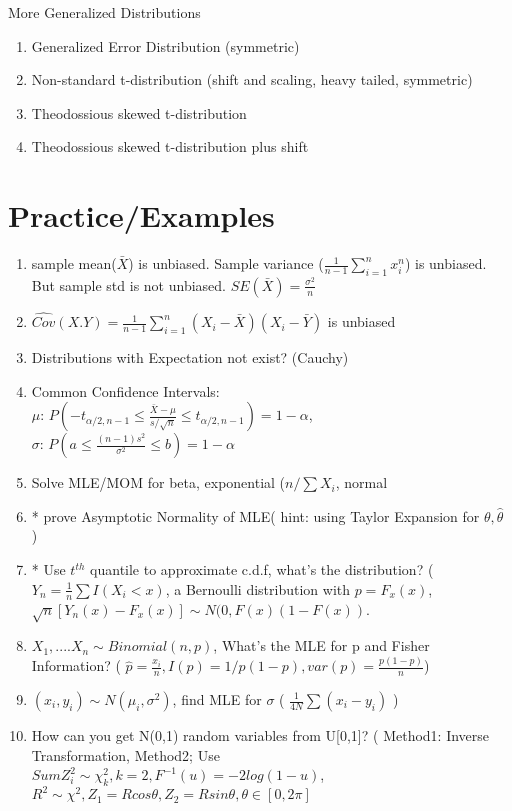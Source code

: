 \documentclass[11pt, openany]{book}              %
\begin{document}
More Generalized Distributions

\begin{enumerate}
	\item Generalized Error Distribution (symmetric)
	\item Non-standard t-distribution (shift and scaling, heavy tailed, symmetric)
	\item Theodossious skewed t-distribution
	\item Theodossious skewed t-distribution plus shift
\end{enumerate}



   
\section{Practice/Examples}

\begin{enumerate}

    \item sample mean($\bar{X}$) is unbiased. Sample variance ($\frac{1}{n-1}\sum_{i=1}^n x_i^n$) is unbiased. But sample std is not unbiased. $SE(\bar{X})=\frac{\sigma^2}{n}$
    \item $\hat{Cov}(X.Y) = \frac{1}{n-1} \sum_{i=1}^n(X_i-\bar{X})(X_i-\bar{Y})$ is unbiased
    \item Distributions with Expectation not exist? (Cauchy) 
    \item Common Confidence Intervals:\\ $\mu$: $P(-t_{\alpha/2, n-1} \leq \frac{\bar{X}-\mu}{s/\sqrt{n}} \leq t_{\alpha/2, n-1})= 1- \alpha$, \\$\sigma$: $P(a \leq \frac{(n-1)s^2}{\sigma^2} \leq b)= 1-\alpha$
    \item Solve MLE/MOM for beta, exponential ($n/\sum{X_i}$, normal 
    \item * prove Asymptotic Normality of MLE( hint: using Taylor Expansion for $\theta, \hat{\theta}$ )
    \item * Use $t^{th}$ quantile to approximate c.d.f, what's the distribution? ($Y_n=\frac{1}{n} \sum I(X_i <x)$, a Bernoulli distribution with $p=F_x(x)$, $\sqrt{n}[Y_n(x) - F_x(x)] \sim N(0, F(x)(1-F(x))$.
 	\item $X_1, .... X_n \sim Binomial(n,p)$, What's the MLE for p and Fisher Information? ( $\hat{p}= \frac{x_i}{n}, I(p) = 1/p(1-p), var(p) = \frac{p(1-p)}{n}$)
 	\item $(x_i,y_i) \sim N(\mu_i, \sigma^2)$, find MLE for $\sigma$ ( $\frac{1}{4N} \sum(x_i-y_i)$ )
 	\item How can you get N(0,1) random variables from U[0,1]? ( Method1: Inverse Transformation, Method2; Use $Sum Z_i^2 \sim \chi_k^2, k = 2, F^{-1}(u) = -2log(1-u)$, $R^2 \sim \chi^2, Z_1 = Rcos\theta, Z_2 = Rsin\theta, \theta \in [0, 2\pi]$
\end{enumerate}
\end{document}
